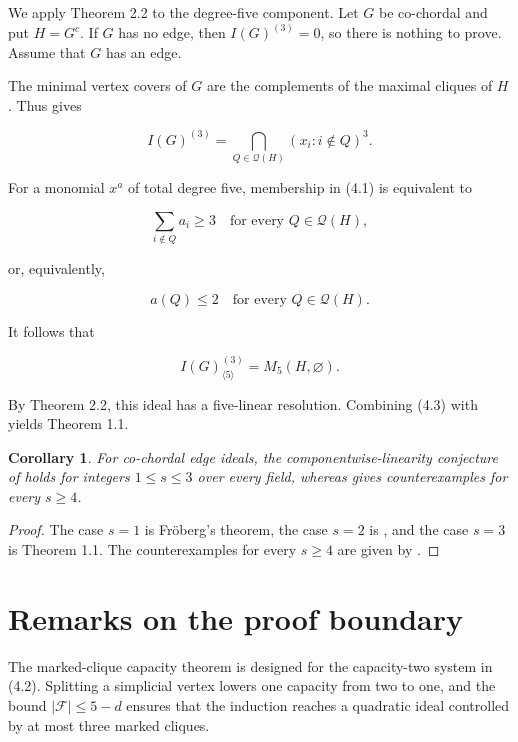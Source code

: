 \documentclass[11pt]{article}
\newtheorem{corollary}[theorem]{Corollary}
\theoremstyle{definition}
\theoremstyle{remark}
\numberwithin{equation}{section}
\begin{document}
We apply Theorem 2.2 to the degree-five component. Let $G$ be co-chordal and
put $H=G^c$. If $G$ has no edge, then $I(G)^{(3)}=0$, so there is nothing to
prove. Assume that $G$ has an edge.

The minimal vertex covers of $G$ are the complements of the maximal cliques
of $H$. Thus \cite[Equation (1)]{ahmed2026} gives

\nopagebreak[4]
\[
I(G)^{(3)}
=
\bigcap_{Q\in\mathcal Q(H)}
(x_i:i\notin Q)^3.
\tag{4.1}
\]

For a monomial $x^a$ of total degree five, membership in (4.1) is equivalent
to

\nopagebreak[4]
\[
\sum_{i\notin Q}a_i\geq3
\quad\text{for every }Q\in\mathcal Q(H),
\]

or, equivalently,

\nopagebreak[4]
\[
a(Q)\leq2
\quad\text{for every }Q\in\mathcal Q(H).
\tag{4.2}
\]

It follows that

\nopagebreak[4]
\[
I(G)^{(3)}_{\langle5\rangle}=M_5(H,\varnothing).
\tag{4.3}
\]

By Theorem 2.2, this ideal has a five-linear resolution. Combining (4.3) with
\cite[Theorem 1.2]{ahmed2026} yields Theorem 1.1.
\hfill\qedsymbol


\Needspace{0.25\textheight}
\begin{corollary}

For co-chordal edge ideals, the componentwise-linearity conjecture of \cite{ficarra2024}
holds for integers $1\leq s\leq3$ over every field, whereas \cite{ahmed2026} gives counterexamples for
every $s\geq4$.

\end{corollary}


\begin{proof}

The case $s=1$ is Fröberg's theorem, the case $s=2$ is \cite[Theorem 3.5]{ficarra2024}, and
the case $s=3$ is Theorem 1.1. The counterexamples for every $s\geq4$ are
given by \cite[Proposition 6.4]{ahmed2026}.
\end{proof}


\section{Remarks on the proof boundary}


The marked-clique capacity theorem is designed for the capacity-two system in
(4.2). Splitting a simplicial vertex lowers one capacity from two to one, and
the bound $|\mathcal F|\leq5-d$ ensures that the induction reaches a quadratic
ideal controlled by at most three marked cliques.
\end{document}
